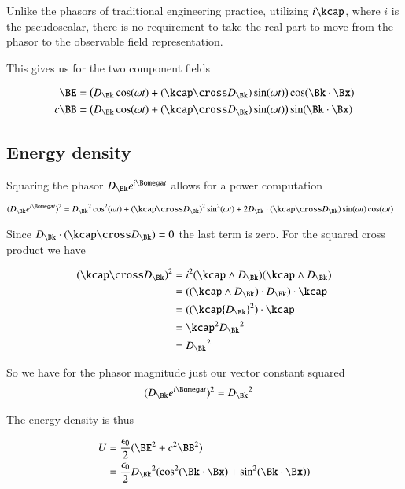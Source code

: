 Unlike the phasors of traditional engineering practice, utilizing $i\kcap$, where $i$ is the pseudoscalar, there is no requirement to take the real part to move from the phasor to the observable field representation.  

This gives us for the two component fields

\begin{align}\label{eqn:splitFields}
\BE &= \left( D_\Bk \cos(\omega t) + (\kcap \cross D_\Bk) \sin(\omega t) \right) \cos(\Bk \cdot \Bx) \\
c \BB &= \left( D_\Bk \cos(\omega t) + (\kcap \cross D_\Bk) \sin(\omega t) \right) \sin(\Bk \cdot \Bx)
\end{align}

\subsection{Energy density}

Squaring the phasor $D_\Bk e^{i\Bomega t}$ allows for a power computation

\begin{align*}
(D_\Bk e^{i\Bomega t} )^2
&=
{D_\Bk}^2 \cos^2(\omega t) + (\kcap \cross D_\Bk)^2 \sin^2(\omega t) + 2 D_\Bk \cdot (\kcap \cross D_\Bk) \sin(\omega t) \cos(\omega t)
\end{align*}

Since $D_\Bk \cdot (\kcap \cross D_\Bk) = 0$ the last term is zero.  For the squared cross product we have

\begin{align*}
(\kcap \cross D_\Bk)^2
&= i^2 
(\kcap \wedge D_\Bk) (\kcap \wedge D_\Bk) \\
&= 
((\kcap \wedge D_\Bk) \cdot D_\Bk ) \cdot \kcap  \\
&= 
((\kcap {D_\Bk}^2 ) \cdot \kcap  \\
&= 
\kcap^2 {D_\Bk}^2  \\
&= 
{D_\Bk}^2 
\end{align*}

So we have for the phasor magnitude just our vector constant squared
\begin{align}
(D_\Bk e^{i\Bomega t} )^2
&= 
{D_\Bk}^2 
\end{align}

The energy density is thus

\begin{align*}
U 
&= \frac{\epsilon_0}{2}(\BE^2 + c^2 \BB^2) \\
&= \frac{\epsilon_0}{2} {D_\Bk}^2 ( \cos^2(\Bk \cdot \Bx) +\sin^2(\Bk \cdot \Bx) )
\end{align*}

